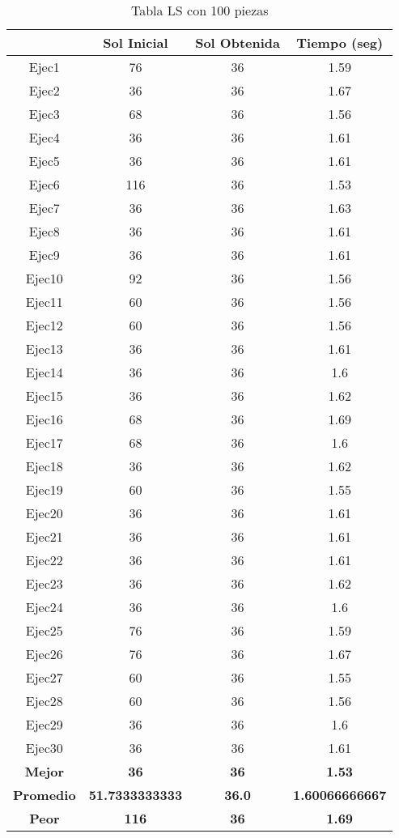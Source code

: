 
\begin{table}
\caption{Tabla LS con 100 piezas}
\centering
\begin{tabular}{|c|c|c|c|}
\hline
 & {\bf Sol Inicial} & {\bf Sol Obtenida} & {\bf Tiempo (seg)} \\
\hline
Ejec1 & 76 & 36  & 1.59 \\
\hline
Ejec2 & 36 & 36  & 1.67 \\
\hline
Ejec3 & 68 & 36  & 1.56 \\
\hline
Ejec4 & 36 & 36  & 1.61 \\
\hline
Ejec5 & 36 & 36  & 1.61 \\
\hline
Ejec6 & 116 & 36  & 1.53 \\
\hline
Ejec7 & 36 & 36  & 1.63 \\
\hline
Ejec8 & 36 & 36  & 1.61 \\
\hline
Ejec9 & 36 & 36  & 1.61 \\
\hline
Ejec10 & 92 & 36  & 1.56 \\
\hline
Ejec11 & 60 & 36  & 1.56 \\
\hline
Ejec12 & 60 & 36  & 1.56 \\
\hline
Ejec13 & 36 & 36  & 1.61 \\
\hline
Ejec14 & 36 & 36  & 1.6 \\
\hline
Ejec15 & 36 & 36  & 1.62 \\
\hline
Ejec16 & 68 & 36  & 1.69 \\
\hline
Ejec17 & 68 & 36  & 1.6 \\
\hline
Ejec18 & 36 & 36  & 1.62 \\
\hline
Ejec19 & 60 & 36  & 1.55 \\
\hline
Ejec20 & 36 & 36  & 1.61 \\
\hline
Ejec21 & 36 & 36  & 1.61 \\
\hline
Ejec22 & 36 & 36  & 1.61 \\
\hline
Ejec23 & 36 & 36  & 1.62 \\
\hline
Ejec24 & 36 & 36  & 1.6 \\
\hline
Ejec25 & 76 & 36  & 1.59 \\
\hline
Ejec26 & 76 & 36  & 1.67 \\
\hline
Ejec27 & 60 & 36  & 1.55 \\
\hline
Ejec28 & 60 & 36  & 1.56 \\
\hline
Ejec29 & 36 & 36  & 1.6 \\
\hline
Ejec30 & 36 & 36  & 1.61 \\
\hline
{\bf Mejor} & {\bf 36} & {\bf 36} & {\bf 1.53} \\
\hline
{\bf Promedio} & {\bf 51.7333333333} & {\bf 36.0} & {\bf 1.60066666667} \\
\hline
{\bf Peor} & {\bf 116} & {\bf 36} & {\bf 1.69} \\
\hline
\end{tabular}
\end{table}

